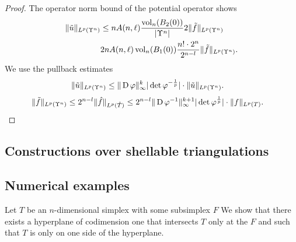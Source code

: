 \documentclass[a4paper]{article}
\begin{document}
\begin{proof}
    The operator norm bound of the potential operator shows 
    \begin{align*}
        \| \tilde u \|_{L^{p}(\Upsilon^{n})} 
        &\leq 
        n A(n,\ell) \frac{ \operatorname{vol}_{n}(B_2(0)) }{|\Upsilon^{n}|} 2 
        \| \tilde f \|_{L^{p}(\Upsilon^{n})}
        \\&
        2 n A(n,\ell) \operatorname{vol}_{n}(B_1(0)) \frac{ n! \cdot 2^{n} }{2^{n-l}} 
        \| \tilde f \|_{L^{p}(\Upsilon^{n})}
        .
    \end{align*}
    We use the pullback estimates 
    \begin{align*}
        \| \tilde u \|_{L^{p}(\Upsilon^{n})} 
        &\leq 
        \| \operatorname{D}\varphi \|_{\infty}^{k}
        |\det\varphi^{-\frac{1}{p}}|
        \cdot 
        \| \tilde u \|_{L^{p}(\Upsilon^{n})} 
        .
    \end{align*}
    \begin{align*}
        \| \tilde f \|_{L^{p}(\Upsilon^{n})} 
        &\leq 
        2^{n-l}
        \| \hat f \|_{L^{p}(\hat T)} 
        \leq 
        2^{n-l}
        \| \operatorname{D}\varphi^{-1} \|_{\infty}^{k+1}
        |\det\varphi^{\frac{1}{p}}|
        \cdot 
        \| f \|_{L^{p}(T)} 
        .
    \end{align*}
\end{proof}







\subsection{Constructions over shellable triangulations}

\subsection{Numerical examples}



Let $T$ be an $n$-dimensional simplex with some subsimplex $F$ We show that there exists a hyperplane of codimension one that intersects $T$ only at the $F$ and such that $T$ is only on one side of the hyperplane. 
\end{document}
